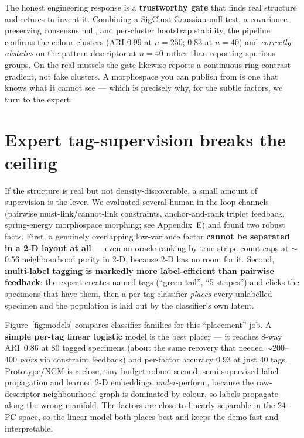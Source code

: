 \documentclass[11pt]{article}
\begin{document}
The honest engineering response is a \textbf{trustworthy gate} that finds real structure and refuses to invent
it. Combining a SigClust Gaussian-null test, a covariance-preserving consensus null, and per-cluster bootstrap
stability, the pipeline confirms the colour clusters (ARI 0.99 at $n{=}250$; 0.83 at $n{=}40$) and
\emph{correctly abstains} on the pattern descriptor at $n{=}40$ rather than reporting spurious groups. On the
real mussels the gate likewise reports a continuous ring-contrast gradient, not fake clusters. A morphospace
you can publish from is one that knows what it cannot see --- which is precisely why, for the subtle factors,
we turn to the expert.

\section{Expert tag-supervision breaks the ceiling}
\label{sec:tag}

If the structure is real but not density-discoverable, a small amount of supervision is the lever. We evaluated
several human-in-the-loop channels (pairwise must-link/cannot-link constraints, anchor-and-rank triplet
feedback, spring-energy morphospace morphing; see Appendix~E) and found two robust facts. First, a genuinely
overlapping low-variance factor \textbf{cannot be separated in a 2-D layout at all} --- even an oracle ranking
by true stripe count caps at $\sim$0.56 neighbourhood purity in 2-D, because 2-D has no room for it. Second,
\textbf{multi-label tagging is markedly more label-efficient than pairwise feedback}: the expert creates
named tags (``green tail'', ``5 stripes'') and clicks the specimens that have them, then a per-tag classifier
\emph{places} every unlabelled specimen and the population is laid out by the classifier's own latent.

Figure~\ref{fig:models} compares classifier families for this ``placement'' job. A \textbf{simple per-tag
linear logistic} model is the best placer --- it reaches 8-way ARI~0.86 at 80 tagged specimens (about the same
recovery that needed $\sim$200--400 \emph{pairs} via constraint feedback) and per-factor accuracy 0.93 at just
40 tags. Prototype/NCM is a close, tiny-budget-robust second; semi-supervised label propagation and learned 2-D
embeddings \emph{under}-perform, because the raw-descriptor neighbourhood graph is dominated by colour, so
labels propagate along the wrong manifold. The factors are close to linearly separable in the 24-PC space, so
the linear model both places best and keeps the demo fast and interpretable.
\end{document}
